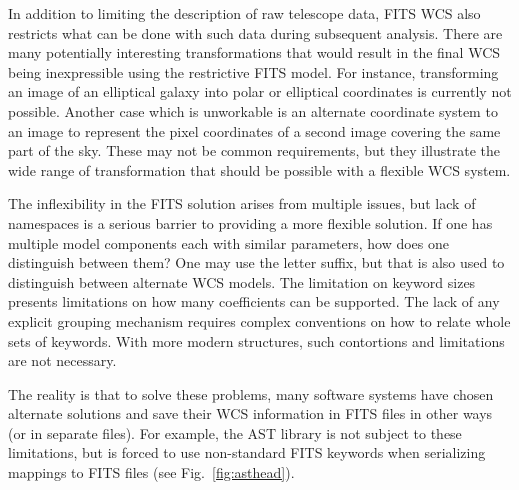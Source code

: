 \documentclass[final,authoryear,5p,times,twocolumn]{elsarticle}
\begin{document}
{{In addition to limiting the description of raw telescope data, FITS
WCS also restricts what can be done with such data during subsequent
analysis. There are many potentially interesting transformations that
would result in the final WCS being inexpressible using the
restrictive FITS model. For instance, transforming an image of an
elliptical galaxy into polar or elliptical coordinates is currently not possible. Another
case which is unworkable is an alternate coordinate system to an image to
represent the pixel coordinates of a second image covering the same
part of the sky.  These may not be common requirements, but they
illustrate the wide range of transformation that should be possible
with a flexible WCS system.


The inflexibility in the FITS solution arises from multiple issues,
but lack of namespaces is a serious barrier to providing a more
flexible solution. If one has multiple model components each with
similar parameters, how does one distinguish between them? One may use
the letter suffix, but that is also used to distinguish between
alternate WCS models. The limitation on keyword sizes presents
limitations on how many coefficients can be supported. The lack of any
explicit grouping mechanism requires complex conventions on how to
relate whole sets of keywords. With more modern structures, such
contortions and limitations are not necessary.


The reality is that to solve these problems, many software systems
have chosen alternate solutions and save their WCS information in FITS
files in other ways (or in separate files). For example, the AST
library \citep{1998ASPC..145...41W,2012ASPC..461..825B} is not subject
to these limitations, but
is forced to use non-standard FITS keywords when serializing mappings
to FITS files (see Fig.~\ref{fig:asthead}).


}}
\end{document}

